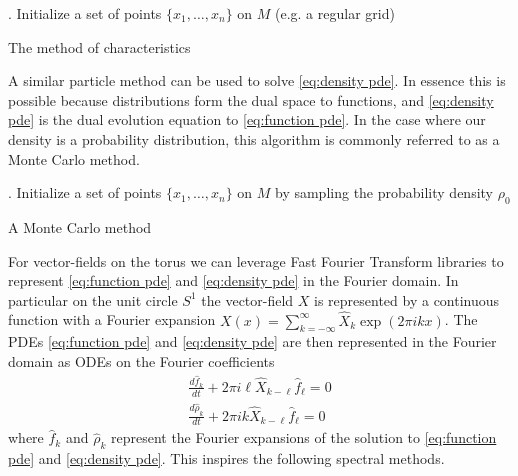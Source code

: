\documentclass[12pt]{amsart}
\begin{document}
\begin{algorithm}[h]
	.
	Initialize a set of points $\{ x_{1},\dots,x_{n} \}$ on $M$ (e.g. a regular grid) \;
	\caption{The method of characteristics}\label{alg:particle}
\end{algorithm}

A similar particle method can be used to solve \eqref{eq:density pde}.
In essence this is possible because distributions form the dual space to functions, and \eqref{eq:density pde} is the dual evolution equation to \eqref{eq:function pde}.
In the case where our density is a probability distribution, this algorithm is commonly referred to as a Monte Carlo method.

\begin{algorithm}[h]
	.
	Initialize a set of points $\{ x_{1},\dots,x_{n} \}$ on $M$ by sampling the probability density $\rho_{0}$\;
	\caption{A Monte Carlo method}\label{alg:Monte Carlo}
\end{algorithm}

For vector-fields on the torus we can leverage Fast Fourier Transform libraries to represent \eqref{eq:function pde} and \eqref{eq:density pde} in the Fourier domain.
In particular on the unit circle $S^{1}$ the vector-field $X$ is represented by a continuous function with a Fourier expansion $X(x) = \sum_{k=-\infty}^{\infty} \hat{X}_{k} \exp( 2\pi i kx)$.
The PDEs \eqref{eq:function pde} and \eqref{eq:density pde} are then represented in the Fourier domain as
ODEs on the Fourier coefficients
\begin{align}
	\frac{d \hat{f}_{k}}{dt} + 2\pi i \ell \hat{X}_{k-\ell} \hat{f}_{\ell} = 0 \\
	\frac{d \hat{\rho}_{k}}{dt} + 2\pi i k \hat{X}_{k-\ell} \hat{f}_{\ell} = 0
\end{align}
where $\hat{f}_{k}$ and $\hat{\rho}_{k}$ represent the Fourier expansions of the solution to \eqref{eq:function pde} and \eqref{eq:density pde}.
This inspires the following spectral methods.
\end{document}
